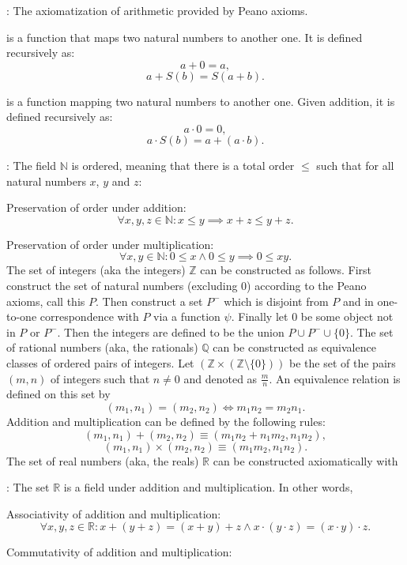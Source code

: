 \documentclass[a4paper,12pt]{article}
\begin{document}
: The axiomatization of arithmetic provided by Peano axioms.
\bit
\item {} is a function that maps two natural numbers to another one. It is defined recursively as:
\[a+0=a,\]
\[a+S(b)=S(a+b).\]
\item {} is a function mapping two natural numbers to another one. Given addition, it is defined recursively as:
\[a\cdot 0=0,\]
\[a\cdot S(b)=a+(a\cdot b).\]
\item {}: The field $\mathbb{N}$ is ordered, meaning that there is a total order $\leq$ such that for all natural numbers $x$, $y$ and $z$:
\bit
\item Preservation of order under addition:
\[\forall x,y,z\in\mathbb{N}\colon x\leq y\implies x+z\leq y+z.\]
\item Preservation of order under multiplication:
\[\forall x,y\in\mathbb{N}\colon 0\leq x\land 0\leq y\implies 0\leq xy.\]
\eit
\eit
{}
The set of integers (aka the integers) $\mathbb{Z}$ can be constructed as follows. First construct the set of natural numbers (excluding $0$) according to the Peano axioms, call this $P$. Then construct a set $P^-$ which is disjoint from $P$ and in one-to-one correspondence with $P$ via a function $\psi$. Finally let $0$ be some object not in $P$ or $P^-$. Then the integers are defined to be the union $P\cup P^{-}\cup \{0\}$.
The set of rational numbers (aka, the rationals) $\mathbb{Q}$ can be constructed as equivalence classes of ordered pairs of integers. Let $(\mathbb {Z} \times (\mathbb {Z} \setminus \{0\}))$⁠ be the set of the pairs $(m, n)$ of integers such that $n \neq 0$ and denoted as $\frac{m}{n}$. An equivalence relation is defined on this set by
\[(m_{1},n_{1})=(m_{2},n_{2})\iff m_{1}n_{2}=m_{2}n_{1}.\]
Addition and multiplication can be defined by the following rules:
\[(m_{1},n_{1})+(m_{2},n_{2})\equiv (m_{1}n_{2}+n_{1}m_{2},n_{1}n_{2}),\]
\[(m_{1},n_{1})\times (m_{2},n_{2})\equiv (m_{1}m_{2},n_{1}n_{2}).\]
The set of real numbers (aka, the reals) $\mathbb{R}$ can be constructed axiomatically with
\bit
\item {}: The set $\mathbb{R}$ is a field under addition and multiplication. In other words,
\bit
\item Associativity of addition and multiplication:
\[\forall x,y,z\in\mathbb{R}\colon x+(y+z)=(x+y)+z\land x\cdot(y\cdot z)=(x\cdot y)\cdot z.\]
\item Commutativity of addition and multiplication:
\end{document}
